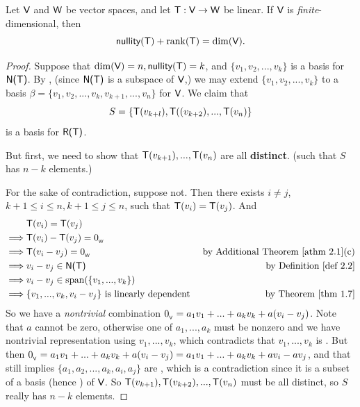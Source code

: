 \begin{theorem}  \label{thm 2.3}
Let \(\textsf{V}\) and \(\textsf{W}\) be vector spaces, and let \(\textsf{T} : \textsf{V} \to \textsf{W}\) be linear.
If \(\textsf{V}\) is \emph{finite}-dimensional, then
\[
    \textsf{nullity}(\textsf{T}) + \mathrm{rank}(\textsf{T}) = \dim(\textsf{V}).
\]
\end{theorem}

\begin{proof}
Suppose that \(\dim(\textsf{V}) = n, \textsf{nullity}(\textsf{T}) = k\), and \(\{ v_1, v_2, ..., v_k \}\) is a basis for \(\textsf{N(T)}\).
By , (since \(\textsf{N(T)}\) is a subspace of \(\textsf{V}\),) we may extend \(\{ v_1, v_2, ..., v_k \}\) to a basis \(\beta = \{ v_1, v_2, ..., v_k, v_{k +1}, ..., v_n \}\) for \(\textsf{V}\).
We claim that
\[
    S = \{ \textsf{T}(v_{k + l}), \textsf{T}((v_{k + 2}), ..., \textsf{T}(v_n) \}
\]
is a basis for \(\textsf{R(T)}\).

But first, we need to show that \(\textsf{T}(v_{k + 1}), ..., \textsf{T}(v_n)\) are all \textbf{distinct}. (such that \(S\) has \(n - k\) elements.)

For the sake of contradiction, suppose not.
Then there exists \(i \ne j\), \(k + 1 \le i \le n, k + 1 \le j \le n\), such that \(\textsf{T}(v_i) = \textsf{T}(v_j)\).
And
\begin{align*}
             & \T(v_i) = \T(v_j) \\
    \implies & \T(v_i) - \T(v_j) = \OW \\
    \implies & \T(v_i - v_j) = \OW & \text{by \ATHM{2.1}(c)} \\
    \implies & v_i - v_j \in \NULLT & \text{by \DEF{2.2}} \\
    \implies & v_i - v_j \in \spann(\{ v_1, ..., v_k \}) \\
    \implies & \{ v_1, ..., v_k, v_i - v_j \} \text{ is \LDP{} } & \text{by \THM{1.7}}
\end{align*}
So we have a \emph{nontrivial} combination \(0_{_{\textsf{V}}} = a_1 v_1 + ... + a_k v_k + a (v_i - v_j)\).
Note that \(a\) cannot be zero, otherwise one of \(a_1, ..., a_k\) must be nonzero and we have nontrivial representation using \(v_1, ..., v_k\), which contradicts that \(v_1, ..., v_k\) is \LID{}.
But then \(0_{_{\textsf{V}}} = a_1 v_1 + ... + a_k v_k + a (v_i - v_j) = a_1 v_1 + ... + a_k v_k + a v_i - a v_j\), and that still implies \(\{ a_1, a_2, ..., a_k, a_i, a_j \}\) are \LDP{}, which is a contradiction since it is a subset of a basis (hence \LID{}) of \(\textsf{V}\).
So \(\textsf{T}(v_{k + 1}), \textsf{T}(v_{k + 2}), ..., \textsf{T}(v_n)\) must be all distinct, so \(S\) really has \(n - k\) elements.


\end{proof}
